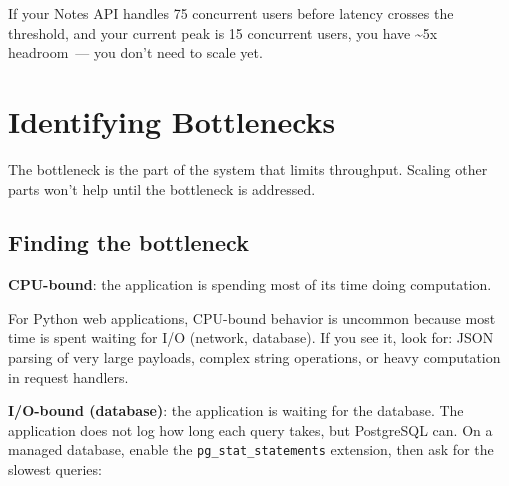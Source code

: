 \noindent{}If your Notes API handles 75 concurrent users before latency crosses the threshold, and your current peak is 15 concurrent users, you have \textasciitilde5x headroom~--- you don't need to scale yet.

\setcounter{section}{1}
\section{Identifying Bottlenecks}\label{36-scaling-load:362-identifying-bottlenecks}

The bottleneck is the part of the system that limits throughput. Scaling other parts won't help until the bottleneck is addressed.

\subsection*{Finding the bottleneck}\label{36-scaling-load:finding-the-bottleneck}

\textbf{CPU-bound}: the application is spending most of its time doing computation.

\begin{codebox}[short]

\begin{Shaded}
\begin{Highlighting}[]
\end{Highlighting}
\end{Shaded}

\end{codebox}

\noindent{}For Python web applications, CPU-bound behavior is uncommon because most time is spent waiting for I/O (network, database). If you see it, look for: JSON parsing of very large payloads, complex string operations, or heavy computation in request handlers.

\textbf{I/O-bound (database)}: the application is waiting for the database.
The application does not log how long each query takes, but PostgreSQL can. On a managed database, enable the \texttt{pg\_stat\_statements} extension, then ask for the slowest queries:

